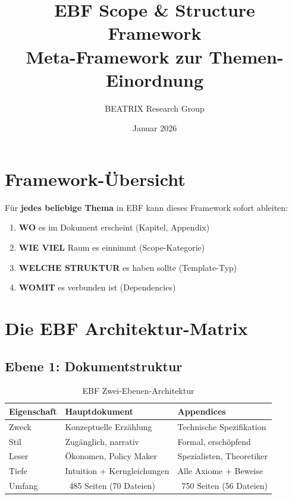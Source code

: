\documentclass[12pt,a4paper]{article}
\title{EBF Scope \& Structure Framework\\
\large Meta-Framework zur Themen-Einordnung}
\author{BEATRIX Research Group}
\date{Januar 2026}
\begin{document}
\maketitle
\tableofcontents
\newpage

\section{Framework-Übersicht}

\begin{tcolorbox}[colback=blue!5!white, colframe=blue!75!black, 
    title=Zweck dieses Frameworks]

Für \textbf{jedes beliebige Thema} in EBF kann dieses Framework sofort ableiten:

\begin{enumerate}[nosep]
\item \textbf{WO} es im Dokument erscheint (Kapitel, Appendix)
\item \textbf{WIE VIEL} Raum es einnimmt (Scope-Kategorie)
\item \textbf{WELCHE STRUKTUR} es haben sollte (Template-Typ)
\item \textbf{WOMIT} es verbunden ist (Dependencies)
\end{enumerate}

\end{tcolorbox}

\section{Die EBF Architektur-Matrix}

\subsection{Ebene 1: Dokumentstruktur}

\begin{table}[htbp]
\centering
\caption{EBF Zwei-Ebenen-Architektur}
\renewcommand{\arraystretch}{1.4}
\begin{tabular}{@{}p{3cm}p{5.5cm}p{5.5cm}@{}}
\toprule
\textbf{Eigenschaft} & \textbf{Hauptdokument} & \textbf{Appendices} \\
\midrule
Zweck & Konzeptuelle Erzählung & Technische Spezifikation \\
Stil & Zugänglich, narrativ & Formal, erschöpfend \\
Leser & Ökonomen, Policy Maker & Spezialisten, Theoretiker \\
Tiefe & Intuition + Kerngleichungen & Alle Axiome + Beweise \\
Umfang & ~485 Seiten (70 Dateien) & ~750 Seiten (56 Dateien) \\
\bottomrule
\end{tabular}
\end{table}
\end{document}
